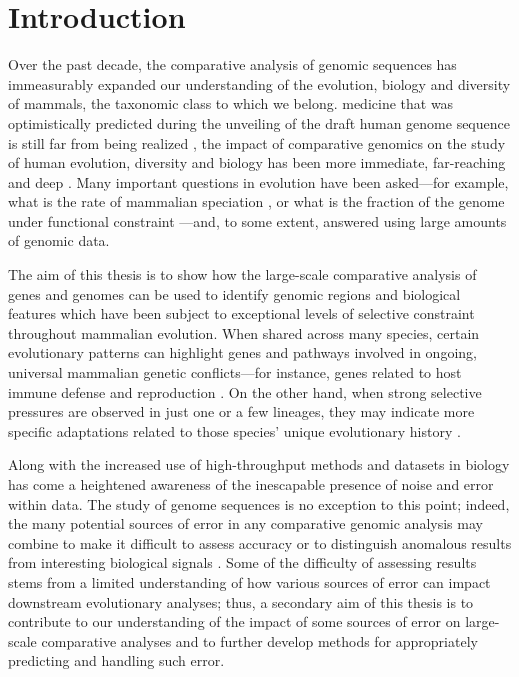 \chapter{Introduction}
\label{ch_intro}
\acresetall

Over the past decade, the comparative analysis of genomic sequences
has immeasurably expanded our understanding of the evolution, biology
and diversity of mammals, the taxonomic class to which we belong.
medicine that was optimistically predicted during the unveiling of the
draft human genome sequence is still far from being realized
\citep{Collins2001,Varmus2010}, the impact of comparative genomics on
the study of human evolution, diversity and biology has been more
immediate, far-reaching and deep \citep{OBrien1999,Lander2011}. Many
important questions in evolution have been asked---for example, what
is the rate of mammalian speciation
\citep{BinindaEmonds2007,Venditti2011}, or what is the fraction of the
genome under functional constraint
\citep{Boffelli2003a,Siepel2005,Ponting2011}---and, to some extent,
answered using large amounts of genomic data.

The aim of this thesis is to show how the large-scale comparative
analysis of genes and genomes can be used to identify genomic regions
and biological features which have been subject to exceptional levels
of selective constraint throughout mammalian evolution. When shared
across many species, certain evolutionary patterns can highlight genes
and pathways involved in ongoing, universal mammalian genetic
conflicts---for instance, genes related to host immune defense and
reproduction \citep{CastilloDavis2004}. On the other hand, when strong
selective pressures are observed in just one or a few lineages, they
may indicate more specific adaptations related to those species'
unique evolutionary history
\citep{Messier1997,Sawyer2005a,Nielsen2007}.

Along with the increased use of high-throughput methods and datasets
in biology has come a heightened awareness of the inescapable presence
of noise and error within data. The study of genome sequences is no
exception to this point; indeed, the many potential sources of error
in any comparative genomic analysis may combine to make it difficult
to assess accuracy or to distinguish anomalous results from
interesting biological signals
\citep{Mallick2009,Schneider2009,Fletcher2010,MarkovaRaina2011}. Some
of the difficulty of assessing results stems from a limited
understanding of how various sources of error can impact downstream
evolutionary analyses; thus, a secondary aim of this thesis is to
contribute to our understanding of the impact of some sources of error
on large-scale comparative analyses and to further develop methods for
appropriately predicting and handling such error.

